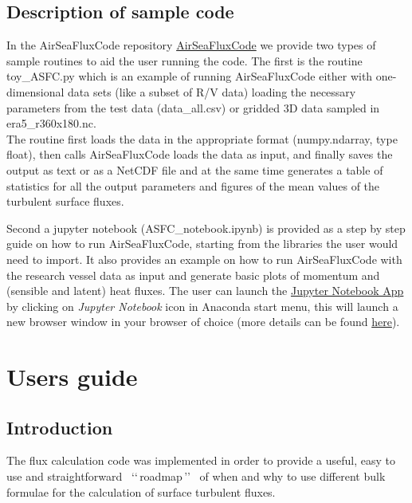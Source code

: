 \documentclass[letterpaper,10pt,english]{sphinxmanual}
\begin{document}
\section{Description of sample code}
In the AirSeaFluxCode repository \url{AirSeaFluxCode} we provide two types of sample routines to aid the user running the code. The first is the routine toy\_ASFC.py which is an example of running AirSeaFluxCode either with one-dimensional data sets (like a subset of R/V data) loading the necessary parameters from the test data (data\_all.csv) or gridded 3D data sampled in era5\_r360x180.nc.\\
The routine first loads the data in the appropriate format (numpy.ndarray, type float), then calls AirSeaFluxCode loads the data as input, and finally saves the output as  text or as a NetCDF file and at the same time generates a table of statistics for all the output parameters and figures of the mean values of the turbulent surface fluxes.

Second a jupyter notebook (ASFC\_notebook.ipynb) is provided as a step by step guide on how to run AirSeaFluxCode, starting from the libraries the user would need to import. It also provides an example on how to run AirSeaFluxCode with the research vessel data as input and generate basic plots of momentum and (sensible and latent) heat fluxes. The user can launch the \href{https://jupyter-notebook-beginner-guide.readthedocs.io/en/latest/what\_is\_jupyter.html}{Jupyter Notebook App} by clicking on \textit{Jupyter Notebook} icon in Anaconda start menu, this will launch a new browser window in your browser of choice (more details can be found \href{https://jupyter-notebook-beginner-guide.readthedocs.io/en/latest/execute.html}{here}).




\chapter{Users guide}
\label{\detokenize{index:users-guide}}


\section{Introduction}
\label{\detokenize{index:introduction}}
The flux calculation code was implemented in order to provide a useful, easy to use and straightforward ~\lq\lq\,roadmap\,\rq\rq~ of when and why to use different bulk formulae for the calculation of surface turbulent fluxes.
\end{document}
